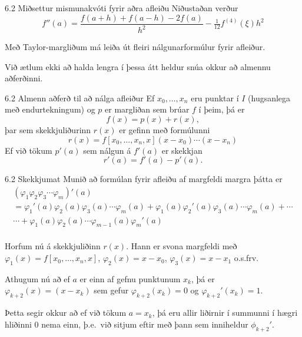 \begin{frame}{6.2 Miðsettur mismunakvóti fyrir aðra afleiðu} 
Niðustaðan verður 
$$
f''(a)=\dfrac{f(a+h)+f(a-h)-2f(a)}{h^2}-\tfrac 1{12}f^{(4)}(\xi)h^2
$$

\pause
\smallskip
Með Taylor-margliðum  má leiða út fleiri nálgunarformúlur fyrir
afleiður.  

\smallskip
Við ætlum ekki að halda lengra í þessa átt heldur snúa okkur að
almennu aðferðinni.
\end{frame}


\begin{frame}{6.2 Almenn aðferð til að nálga afleiður} 
Ef $x_0,\ldots, x_n$ eru punktar í $I$ (hugsanlega með endurtekningum)
og $p$ er margliðan sem brúar $f$ í þeim, þá er 
\begin{equation*}
  f(x) = p(x) + r(x),
\end{equation*}
þar sem  skekkjuliðurinn $r(x)$ er gefinn með formúlunni
$$
r(x)=f[x_0,\ldots,x_n,x](x-x_0)\cdots(x-x_n)
$$
Ef við tökum $p'(a)$ sem nálgun á $f'(a)$ er skekkjan
\begin{equation*}
r'(a) =  f'(a) - p'(a). 
\end{equation*}
\end{frame}


\begin{frame}{6.2 Skekkjumat} 
Munið að formúlan fyrir afleiðu af margfeldi margra þátta er
\begin{multline*}
  (\varphi_1\varphi_2\varphi_3\cdots\varphi_m)'(a)\\
=\varphi_1'(a)\varphi_2(a)\varphi_3(a)\cdots\varphi_m(a)
+\varphi_1(a)\varphi_2'(a)\varphi_3(a)\cdots\varphi_m(a)
+\cdots\\
\cdots+\varphi_1(a)\varphi_2(a)\cdots \varphi_{m-1}(a)\varphi_m'(a)\\
\end{multline*}

\pause
\smallskip
Horfum nú á skekkjuliðinn $r(x)$.  Hann er svona margfeldi með 
$\varphi_1(x)=f[x_0,\dots,x_n,x]$, $\varphi_2(x)=x-x_0$,
$\varphi_3(x)=x-x_1$ o.s.frv.

\pause
\smallskip
Athugum nú að ef $a$ er einn af gefnu punktunum $x_k$, þá er 
$\varphi_{k+2}(x)=(x-x_k)$ sem gefur $\varphi_{k+2}(x_k)=0$ og
$\varphi_{k+2}'(x_k)=1$.  

\smallskip
Þetta segir okkur að ef við tökum $a=x_k$, þá 
eru allir liðirnir í summunni í hægri hliðinni $0$ nema 
einn, þ.e.~við sitjum eftir með þann sem inniheldur $\phi_{k+2}'$.
\end{frame}


